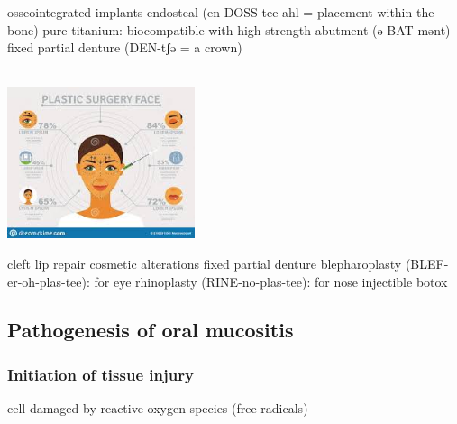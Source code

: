 \documentclass[
paper=landscape,
paper=160mm:90mm, %
fontsize=11pt, %
pagesize, %
parskip=half-, %
]{scrartcl} %
\newenvironment{WrapText1}[3][r]
{\wrapfigure[#2]{#1}{#3}}
{\endwrapfigure}
\newcommand{\wrapr}[6]{
\begin{minipage}{\linewidth}\mbox{}\\
\vspace{#1}
\begin{WrapText1}{#2}{#3}
\vspace{#4}#5\end{WrapText1}#6
\end{minipage}}
\theoremstyle{mythmstyle} %
\newcommand{\comm}[1]{} %
\begin{document}
{{\begin{outline}
\1 osseointegrated implants
    \2 endosteal (en-DOSS-tee-ahl = placement within the bone)
    \2 pure titanium: biocompatible with high strength
    \2 abutment (ə-BAT-mənt)
    \2 fixed partial denture (DEN-tʃə = a crown)
\end{outline}
} %

\clearpage


\wrapr{-8mm}{7}{6cm}{-1mm}
{%
\includegraphics[width=5.5cm]{plastic_face.jpeg}
} %
{%
\begin{outline}

\1 cleft lip repair
\1 cosmetic alterations
    \2 fixed partial denture
    \2 blepharoplasty (BLEF-er-oh-plas-tee): for eye
    \2 rhinoplasty (RINE-no-plas-tee): for nose
    \2 injectible botox
\end{outline}
} %
\clearpage

%
} %



\subsection{Pathogenesis of oral mucositis}


\subsubsection{Initiation of tissue injury}

cell damaged by reactive oxygen species (free radicals) \\
\end{document}
